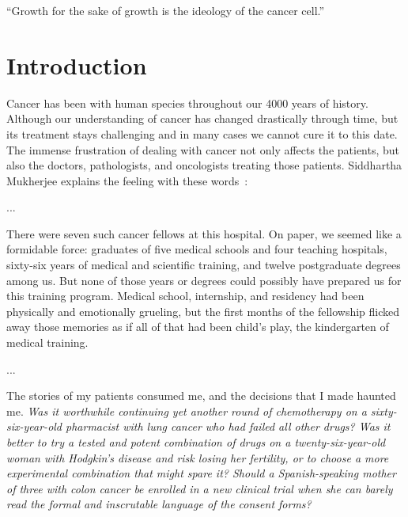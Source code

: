 
\begin{savequote}[.5\linewidth]
  ``Growth for the sake of growth is the ideology of the cancer cell.''
\end{savequote}
\chapter{Introduction}
Cancer has been with human species throughout our 4000 years of history. Although our understanding of cancer has changed drastically through time, but its treatment stays challenging and in many cases we cannot cure it to this date. The immense frustration of dealing with cancer not only affects the patients, but also the doctors, pathologists, and oncologists treating those patients. Siddhartha Mukherjee explains the feeling with these words~\cite[prologue]{the-emperor-of-all-maladies}:

\begin{displayquote}
  ...
  
  There were seven such cancer fellows at this hospital. On paper, we seemed like a formidable force: graduates of five medical schools and four teaching hospitals, sixty-six years of medical and scientific training, and twelve postgraduate degrees among us. But none of those years or degrees could possibly have prepared us for this training program. Medical school, internship, and residency had been physically and emotionally grueling, but the first months of the fellowship flicked away those memories as if all of that had been child's play, the kindergarten of medical training.

  ...

  The stories of my patients consumed me, and the decisions that I made haunted me. \emph{Was it worthwhile continuing yet another round of chemotherapy on a sixty-six-year-old pharmacist with lung cancer who had failed all other drugs? Was it better to try a tested and potent combination of drugs on a twenty-six-year-old woman with Hodgkin's disease and risk losing her fertility, or to choose a more experimental combination that might spare it? Should a Spanish-speaking mother of three with colon cancer be enrolled in a new clinical trial when she can barely read the formal and inscrutable language of the consent forms?}
\end{displayquote}

